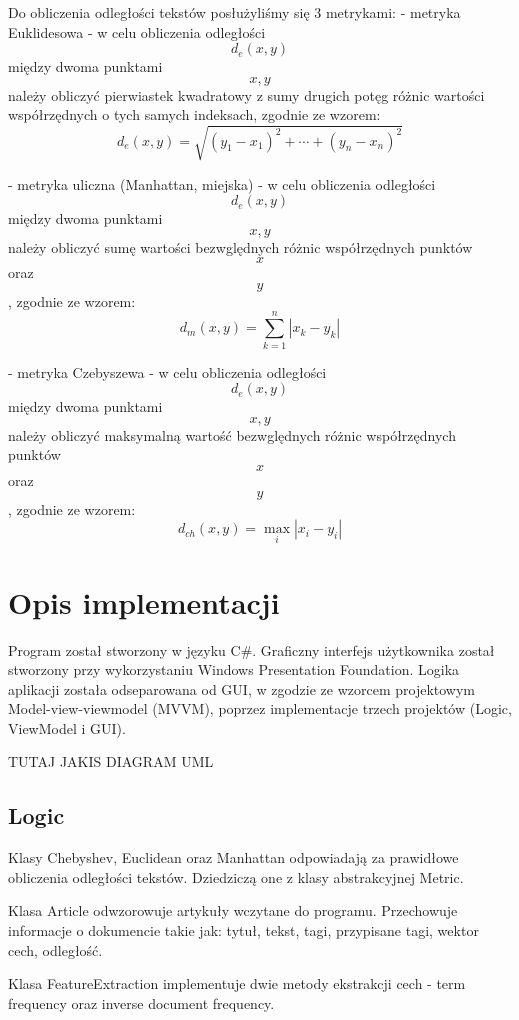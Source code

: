 \documentclass{classrep}
\begin{document}
		Do obliczenia odległości tekstów posłużyliśmy się 3 metrykami:
		- metryka Euklidesowa - w celu obliczenia odległości $$ d_{e}(x,y) $$ między dwoma punktami $$ x, y $$ należy obliczyć pierwiastek kwadratowy z sumy drugich potęg różnic wartości współrzędnych o tych samych indeksach, zgodnie ze wzorem:
			$$
			d_{e}(x,y)= \sqrt{ (y_{1} - x_{1})^2 + \cdots + (y_{n} - x_{n})^2 }
			$$
			
		- metryka uliczna (Manhattan, miejska) - w celu obliczenia odległości $$ d_{e}(x,y) $$ między dwoma punktami $$ x, y $$ należy obliczyć sumę wartości bezwględnych różnic współrzędnych punktów $$ x $$ oraz $$ y $$, zgodnie ze wzorem:
			$$
			d_{m}(x,y)= \sum_{k=1}^{n} | x_{k} - y_{k} |
			$$
			
		- metryka Czebyszewa - w celu obliczenia odległości $$ d_{e}(x,y) $$ między dwoma punktami $$ x, y $$ należy obliczyć maksymalną wartość bezwględnych różnic współrzędnych punktów $$ x $$ oraz $$ y $$, zgodnie ze wzorem:
			$$
			d_{ch}(x,y)= \max_{i} |x_{i} - y_{i}|
			$$

	\section{Opis implementacji}
	Program został stworzony w języku C\#. Graficzny interfejs użytkownika został stworzony przy  wykorzystaniu Windows Presentation Foundation. Logika aplikacji została odseparowana od GUI, w zgodzie ze wzorcem projektowym Model-view-viewmodel (MVVM), poprzez implementacje trzech projektów (Logic, ViewModel i GUI).
	
	\newline TUTAJ JAKIS DIAGRAM UML \newline
	
	\subsection{Logic}
		Klasy Chebyshev, Euclidean oraz Manhattan odpowiadają za prawidłowe obliczenia odległości tekstów. Dziedziczą one z klasy abstrakcyjnej Metric. \newline
		
		Klasa Article odwzorowuje artykuły wczytane do programu. Przechowuje informacje o dokumencie takie jak: tytuł, tekst, tagi, przypisane tagi, wektor cech, odległość. \newline
		
		Klasa FeatureExtraction implementuje dwie metody ekstrakcji cech - term frequency oraz inverse document frequency. \newline
		
\end{document}
